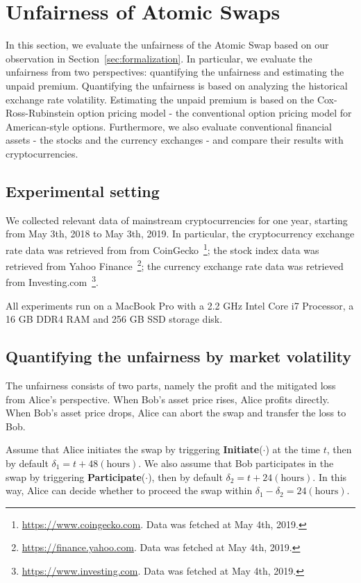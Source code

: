 \section{Unfairness of Atomic Swaps}
\label{sec:evaluation}

In this section, we evaluate the unfairness of the Atomic Swap based on our observation in Section~\ref{sec:formalization}.
In particular, we evaluate the unfairness from two perspectives: quantifying the unfairness and estimating the unpaid premium.
Quantifying the unfairness is based on analyzing the historical exchange rate volatility.
Estimating the unpaid premium is based on the Cox-Ross-Rubinstein option pricing model - the conventional option pricing model for American-style options.
Furthermore, we also evaluate conventional financial assets - the stocks and the currency exchanges - and compare their results with cryptocurrencies.

\subsection{Experimental setting}

We collected relevant data of mainstream cryptocurrencies for one year, starting from May 3th, 2018 to May 3th, 2019.
In particular, the cryptocurrency exchange rate data was retrieved from from CoinGecko~\footnote{\url{https://www.coingecko.com}. Data was fetched at May 4th, 2019.};
the stock index data was retrieved from Yahoo Finance~\footnote{\url{https://finance.yahoo.com}. Data was fetched at May 4th, 2019.};
the currency exchange rate data was retrieved from Investing.com~\footnote{\url{https://www.investing.com}. Data was fetched at May 4th, 2019.}.

All experiments run on a MacBook Pro with a 2.2 GHz Intel Core i7 Processor, a 16 GB DDR4 RAM and 256 GB SSD storage disk.

\subsection{Quantifying the unfairness by market volatility}
\label{subsec:volatility_analysis}

The unfairness consists of two parts, namely the profit and the mitigated loss from Alice's perspective.
When Bob's asset price rises, Alice profits directly.
When Bob's asset price drops, Alice can abort the swap and transfer the loss to Bob.


Assume that Alice initiates the swap by triggering \textbf{Initiate}($\cdot$) at the time $t$, then by default $\delta_1 = t + 48 (\text{hours})$.
We also assume that Bob participates in the swap by triggering \textbf{Participate}($\cdot$), then by default $\delta_2 = t + 24 (\text{hours})$.
In this way, Alice can decide whether to proceed the swap within $ \delta_1 - \delta_2 = 24 (\text{hours})$.

